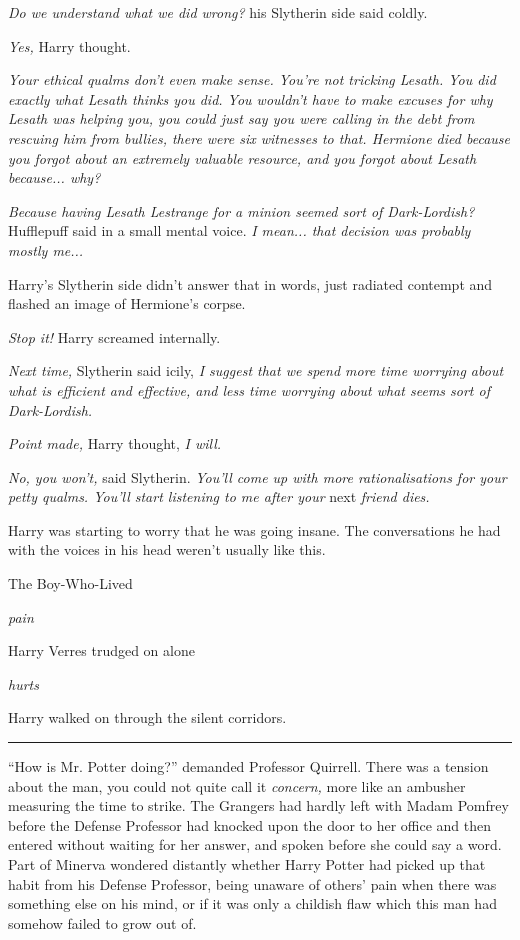 \emph{Do we understand what we did wrong?} his Slytherin side said coldly.

\emph{Yes,} Harry thought.

\emph{Your ethical qualms don't even make sense. You're not tricking Lesath. You did exactly what Lesath thinks you did. You wouldn't have to make excuses for why Lesath was helping you, you could just say you were calling in the debt from rescuing him from bullies, there were six witnesses to that. Hermione died because you forgot about an extremely valuable resource, and you forgot about Lesath because... why?}

\emph{Because having Lesath Lestrange for a minion seemed sort of Dark-Lordish?} Hufflepuff said in a small mental voice. \emph{I mean... that decision was probably mostly me...}

Harry's Slytherin side didn't answer that in words, just radiated contempt and flashed an image of Hermione's corpse.

\emph{Stop it!} Harry screamed internally.

\emph{Next time,} Slytherin said icily, \emph{I suggest that we spend more time worrying about what is efficient and effective, and less time worrying about what seems sort of Dark-Lordish.}

\emph{Point made,} Harry thought, \emph{I will.}

\emph{No, you won't,} said Slytherin. \emph{You'll come up with more rationalisations for your petty qualms. You'll start listening to me after your} next \emph{friend dies.}

Harry was starting to worry that he was going insane. The conversations he had with the voices in his head weren't usually like this.

The Boy-Who-Lived

\emph{pain}

Harry Verres trudged on alone

\emph{hurts}

Harry walked on through the silent corridors.

\begin{center}\rule{3in}{0.4pt}\end{center}

``How is Mr. Potter doing?'' demanded Professor Quirrell. There was a tension about the man, you could not quite call it \emph{concern,} more like an ambusher measuring the time to strike. The Grangers had hardly left with Madam Pomfrey before the Defense Professor had knocked upon the door to her office and then entered without waiting for her answer, and spoken before she could say a word. Part of Minerva wondered distantly whether Harry Potter had picked up that habit from his Defense Professor, being unaware of others' pain when there was something else on his mind, or if it was only a childish flaw which this man had somehow failed to grow out of.

